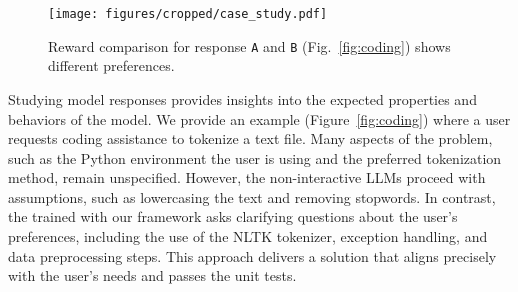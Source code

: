 \begin{figure}[t]
\centering
\begin{minipage}{0.45\textwidth}
    \centering
    \texttt{[image: figures/cropped/case\_study.pdf]}
    \caption{Reward comparison for response \texttt{A} and \texttt{B} (Fig.~\ref{fig:coding}) shows different preferences.}
    \label{fig:reward_preference}
\end{minipage}%
\hfill
\begin{minipage}{0.49\textwidth}
    \centering
    \label{tab:abg_coqa}
\end{minipage}
\end{figure}
Studying model responses provides insights into the expected properties and behaviors of the model. We provide an example (Figure~\ref{fig:coding}) where a user requests coding assistance to tokenize a text file. Many aspects of the problem, such as the Python environment the user is using and the preferred tokenization method, remain unspecified. However, the non-interactive LLMs proceed with assumptions, such as lowercasing the text and removing stopwords. In contrast, the \object trained with our framework asks clarifying questions about the user's preferences, including the use of the NLTK tokenizer, exception handling, and data preprocessing steps. This approach delivers a solution that aligns precisely with the user’s needs and passes the unit tests.

